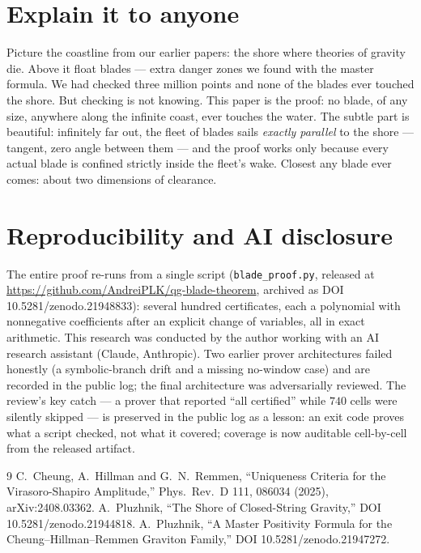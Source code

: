 \documentclass[11pt]{article}
\begin{document}
\section*{Explain it to anyone}
Picture the coastline from our earlier papers: the shore where theories of
gravity die. Above it float blades --- extra danger zones we found with
the master formula. We had checked three million points and none of the
blades ever touched the shore. But checking is not knowing. This paper is
the proof: no blade, of any size, anywhere along the infinite coast, ever
touches the water. The subtle part is beautiful: infinitely far out, the
fleet of blades sails \emph{exactly parallel} to the shore --- tangent, zero
angle between them --- and the proof works only because every actual blade
is confined strictly inside the fleet's wake. Closest any blade ever comes:
about two dimensions of clearance.

\section*{Reproducibility and AI disclosure}
The entire proof re-runs from a single script (\texttt{blade\_proof.py},
released at \url{https://github.com/AndreiPLK/qg-blade-theorem}, archived as
DOI 10.5281/zenodo.21948833):
several hundred certificates, each a polynomial with nonnegative
coefficients after an explicit change of variables, all in exact arithmetic.
This research was conducted by the author working with an AI research
assistant (Claude, Anthropic). Two earlier prover architectures failed
honestly (a symbolic-branch drift and a missing no-window case) and are
recorded in the public log; the final architecture was adversarially
reviewed. The review's key catch --- a prover that reported ``all certified'' while
$740$ cells were silently skipped --- is preserved in the public log as a
lesson: an exit code proves what a script checked, not what it covered;
coverage is now auditable cell-by-cell from the released artifact.

\begin{thebibliography}{9}
 C.~Cheung, A.~Hillman and G.~N.~Remmen,
``Uniqueness Criteria for the Virasoro-Shapiro Amplitude,''
Phys.\ Rev.\ D 111, 086034 (2025), arXiv:2408.03362.
 A.~Pluzhnik, ``The Shore of Closed-String Gravity,''
DOI 10.5281/zenodo.21944818.
 A.~Pluzhnik, ``A Master Positivity Formula for the
Cheung--Hillman--Remmen Graviton Family,'' DOI 10.5281/zenodo.21947272.
\end{thebibliography}
\end{document}
